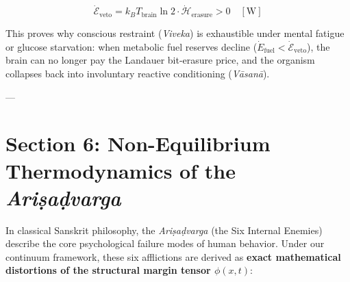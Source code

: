 \documentclass[11pt,a4paper]{article}
\theoremstyle{definition}
\theoremstyle{remark}
\begin{document}
\begin{equation}
\boxed{\dot{\mathcal{E}}_{\text{veto}} = k_B T_{\text{brain}} \ln 2 \cdot \dot{\mathcal{H}}_{\text{erasure}} > 0 \quad [\mathrm{W}]}
\end{equation}

   This proves why conscious restraint (\textit{Viveka}) is exhaustible under mental fatigue or glucose starvation: when metabolic fuel reserves decline ($\dot{E}_{\text{fuel}} < \dot{\mathcal{E}}_{\text{veto}}$), the brain can no longer pay the Landauer bit-erasure price, and the organism collapses back into involuntary reactive conditioning (\textit{Vāsanā}).

---

\section{Section 6: Non-Equilibrium Thermodynamics of the \textit{Ariṣaḍvarga}}

In classical Sanskrit philosophy, the \textit{Ariṣaḍvarga} (the Six Internal Enemies) describe the core psychological failure modes of human behavior. Under our continuum framework, these six afflictions are derived as \textbf{exact mathematical distortions of the structural margin tensor $\phi(x, t)$}:
\end{document}
